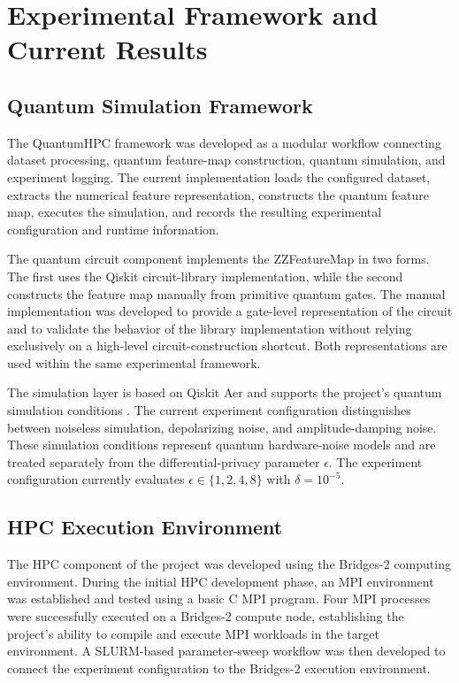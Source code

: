 \documentclass[pdflatex,sn-mathphys-num]{sn-jnl}%
\theoremstyle{thmstyleone}%
\theoremstyle{thmstyletwo}%
\theoremstyle{thmstylethree}%
\begin{document}
\section{Experimental Framework and Current Results}\label{sec2}

\subsection{Quantum Simulation Framework}\label{subsec:framework}

The QuantumHPC framework was developed as a modular workflow connecting dataset processing, quantum feature-map construction, quantum simulation, and experiment logging. The current implementation loads the configured dataset, extracts the numerical feature representation, constructs the quantum feature map, executes the simulation, and records the resulting experimental configuration and runtime information.

The quantum circuit component implements the ZZFeatureMap in two forms. The first uses the Qiskit circuit-library implementation, while the second constructs the feature map manually from primitive quantum gates. The manual implementation was developed to provide a gate-level representation of the circuit and to validate the behavior of the library implementation without relying exclusively on a high-level circuit-construction shortcut. Both representations are used within the same experimental framework.

The simulation layer is based on Qiskit Aer and supports the project's quantum simulation conditions \cite{qiskitaer2025}. The current experiment configuration distinguishes between noiseless simulation, depolarizing noise, and amplitude-damping noise. These simulation conditions represent quantum hardware-noise models and are treated separately from the differential-privacy parameter $\epsilon$. The experiment configuration currently evaluates $\epsilon \in \{1,2,4,8\}$ with $\delta = 10^{-5}$.

\subsection{HPC Execution Environment}\label{subsec:hpc}

The HPC component of the project was developed using the Bridges-2 computing environment. During the initial HPC development phase, an MPI environment was established and tested using a basic C MPI program. Four MPI processes were successfully executed on a Bridges-2 compute node, establishing the project's ability to compile and execute MPI workloads in the target environment. A SLURM-based parameter-sweep workflow was then developed to connect the experiment configuration to the Bridges-2 execution environment.
\end{document}

